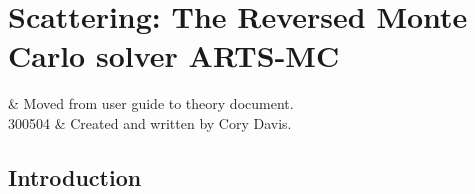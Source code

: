 \graphicspath{{Figs/montecarlo/}}

%
%
\chapter{Scattering: The Reversed Monte Carlo solver ARTS-MC}
 \label{sec:montecarlo}


%
%
 & Moved from user guide to theory document.\\
  300504 & Created and written by Cory Davis.\\
\stophistory


%
%
%

%
%




\section{Introduction}
 \label{sec:montecarlo:intro}

